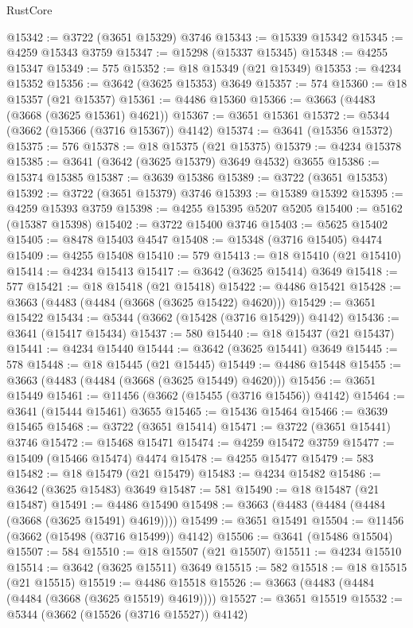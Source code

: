 \begin{lexlean}{RustCore}
\begin{coremodule}
@15342 := @3722 (@3651 @15329) @3746
@15343 := @15339 @15342
@15345 := @4259 @15343 @3759
@15347 := @15298 (@15337 @15345)
@15348 := @4255 @15347
@15349 := 575
@15352 := @18 @15349 (@21 @15349)
@15353 := @4234 @15352
@15356 := @3642 (@3625 @15353) @3649
@15357 := 574
@15360 := @18 @15357 (@21 @15357)
@15361 := @4486 @15360
@15366 := @3663 (@4483 (@3668 (@3625 @15361) @4621))
@15367 := @3651 @15361
@15372 := @5344 (@3662 (@15366 (@3716 @15367)) @4142)
@15374 := @3641 (@15356 @15372)
@15375 := 576
@15378 := @18 @15375 (@21 @15375)
@15379 := @4234 @15378
@15385 := @3641 (@3642 (@3625 @15379) @3649 @4532) @3655
@15386 := @15374 @15385
@15387 := @3639 @15386
@15389 := @3722 (@3651 @15353)
@15392 := @3722 (@3651 @15379) @3746
@15393 := @15389 @15392
@15395 := @4259 @15393 @3759
@15398 := @4255 @15395 @5207 @5205
@15400 := @5162 (@15387 @15398)
@15402 := @3722 @15400 @3746
@15403 := @5625 @15402
@15405 := @8478 @15403 @4547
@15408 := @15348 (@3716 @15405) @4474
@15409 := @4255 @15408
@15410 := 579
@15413 := @18 @15410 (@21 @15410)
@15414 := @4234 @15413
@15417 := @3642 (@3625 @15414) @3649
@15418 := 577
@15421 := @18 @15418 (@21 @15418)
@15422 := @4486 @15421
@15428 := @3663 (@4483 (@4484 (@3668 (@3625 @15422) @4620)))
@15429 := @3651 @15422
@15434 := @5344 (@3662 (@15428 (@3716 @15429)) @4142)
@15436 := @3641 (@15417 @15434)
@15437 := 580
@15440 := @18 @15437 (@21 @15437)
@15441 := @4234 @15440
@15444 := @3642 (@3625 @15441) @3649
@15445 := 578
@15448 := @18 @15445 (@21 @15445)
@15449 := @4486 @15448
@15455 := @3663 (@4483 (@4484 (@3668 (@3625 @15449) @4620)))
@15456 := @3651 @15449
@15461 := @11456 (@3662 (@15455 (@3716 @15456)) @4142)
@15464 := @3641 (@15444 @15461) @3655
@15465 := @15436 @15464
@15466 := @3639 @15465
@15468 := @3722 (@3651 @15414)
@15471 := @3722 (@3651 @15441) @3746
@15472 := @15468 @15471
@15474 := @4259 @15472 @3759
@15477 := @15409 (@15466 @15474) @4474
@15478 := @4255 @15477
@15479 := 583
@15482 := @18 @15479 (@21 @15479)
@15483 := @4234 @15482
@15486 := @3642 (@3625 @15483) @3649
@15487 := 581
@15490 := @18 @15487 (@21 @15487)
@15491 := @4486 @15490
@15498 := @3663 (@4483 (@4484 (@4484 (@3668 (@3625 @15491) @4619))))
@15499 := @3651 @15491
@15504 := @11456 (@3662 (@15498 (@3716 @15499)) @4142)
@15506 := @3641 (@15486 @15504)
@15507 := 584
@15510 := @18 @15507 (@21 @15507)
@15511 := @4234 @15510
@15514 := @3642 (@3625 @15511) @3649
@15515 := 582
@15518 := @18 @15515 (@21 @15515)
@15519 := @4486 @15518
@15526 := @3663 (@4483 (@4484 (@4484 (@3668 (@3625 @15519) @4619))))
@15527 := @3651 @15519
@15532 := @5344 (@3662 (@15526 (@3716 @15527)) @4142)

\end{coremodule}
\end{lexlean}

